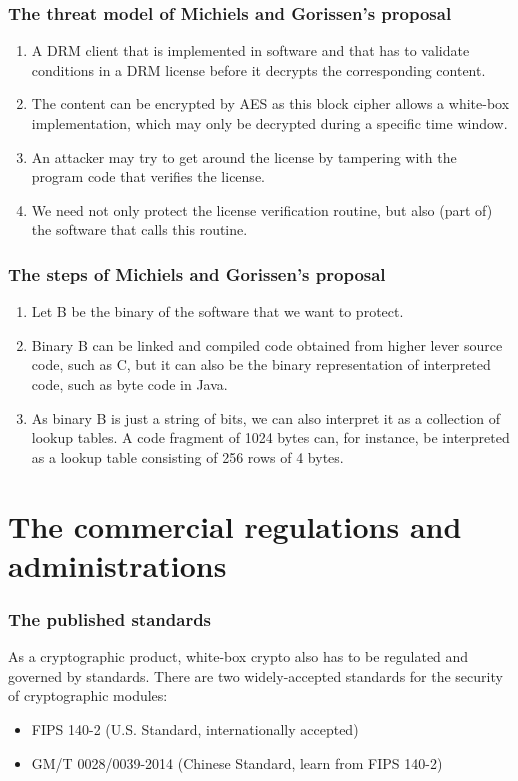 \documentclass{beamer}
\begin{document}
\frame
{
\frametitle{The threat model of Michiels and Gorissen's proposal}
\begin{enumerate}
\setlength{\itemsep}{12pt}
\item A DRM client that is implemented in software and that has to validate conditions in a DRM license before it decrypts the corresponding content. \item The content can be encrypted by AES as this block cipher allows a white-box implementation, which may only be decrypted during a specific time window.
\item An attacker may try to get around the license by tampering with the program code that verifies the license.
\item We need not only protect the license verification routine, but also (part of) the software that calls this routine.
\end{enumerate}
}

\frame
{
\frametitle{The steps of Michiels and Gorissen's proposal}
\begin{enumerate}
\setlength{\itemsep}{12pt}
\item Let B be the binary of the software that we want to protect.
\item Binary B can be linked and compiled code obtained from higher lever source code, such as C, but it can also be the binary representation of interpreted code, such as byte code in Java.
\item As binary B is just a string of bits, we can also interpret it as a collection of lookup tables. A code fragment of 1024 bytes can, for instance, be interpreted as a lookup table consisting of 256 rows of 4 bytes.
\end{enumerate}
}

\section{The commercial regulations and administrations}

\frame
{
\frametitle{The published standards}
As a cryptographic product, white-box crypto also has to be regulated and governed by standards.  There are two widely-accepted standards for the security of cryptographic modules:

\begin{itemize}
\setlength{\itemsep}{12pt}
\item FIPS 140-2 (U.S. Standard, internationally accepted)

\item GM/T 0028/0039-2014 (Chinese Standard, learn from FIPS 140-2)
\end{itemize}
}
\end{document}
